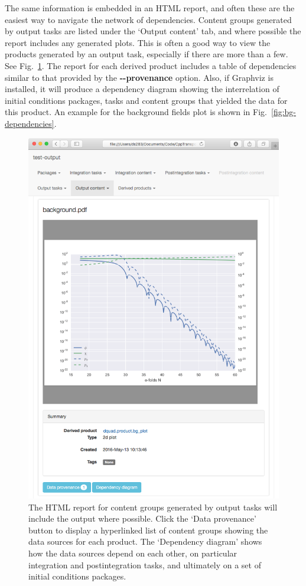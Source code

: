 \documentclass[11pt,a4paper]{article}
\newcommand{\packagefont}{\sffamily}
\newcommand{\Graphviz}{{\packagefont Graphviz}}
\newcommand{\option}[1]{{\ttfamily\bfseries\small #1}}
\begin{document}
The same information is embedded in an HTML report,
and often these are the easiest way to navigate the network of
dependencies.
Content groups generated by output tasks are listed
under the `Output content' tab, and where possible the report
includes any generated plots.
This is often a good way to view the products generated by an output
task, especially if there are more than a few.
See Fig.~\ref{fig:bg-plot-screenshot}.
The report for each derived product includes a table of
dependencies similar to that provided by the
\option{{-}{-}provenance} option.
Also, if {\Graphviz} is installed, it will produce a dependency diagram
showing the interrelation of
initial conditions packages,
tasks and content groups that
yielded the data for this product.
An example for the background fields plot is shown in Fig.~\ref{fig:bg-dependencies}.
\begin{figure}
	\begin{center}
		\includegraphics[scale=0.4]{Screenshots/bg-plot}
	\end{center}
	\caption{\label{fig:bg-plot-screenshot}The HTML report for content groups
	generated by output tasks will include the output where possible.
	Click the `Data provenance' button to display a hyperlinked list of content
	groups showing the data sources for each product.
	The `Dependency diagram' shows how the data sources depend on each other,
	on particular integration and postintegration tasks, and ultimately
	on a set of initial conditions packages.}
\end{figure}
\end{document}
